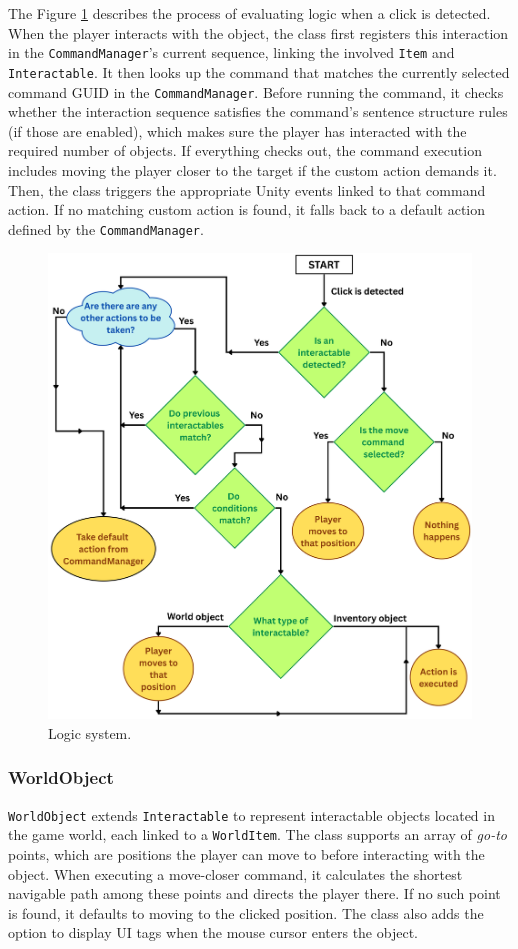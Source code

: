 The Figure \ref{fig:Interactable} describes the process of evaluating logic when a click is detected. When the player interacts with the object, the class first registers this interaction in the \verb|CommandManager|’s current sequence, linking the involved \verb|Item| and \verb|Interactable|. It then looks up the command that matches the currently selected command GUID in the \verb|CommandManager|. Before running the command, it checks whether the interaction sequence satisfies the command’s sentence structure rules (if those are enabled), which makes sure the player has interacted with the required number of objects. If everything checks out, the command execution includes moving the player closer to the target if the custom action demands it. Then, the class triggers the appropriate Unity events linked to that command action. If no matching custom action is found, it falls back to a default action defined by the \verb|CommandManager|.

\begin{figure}[H]
\centering
\includegraphics[width=0.9\linewidth]{img/Commands3.png}
\caption{Logic system.}
\label{fig:Interactable}
\end{figure}

\subsubsection{WorldObject}
\verb|WorldObject| extends \verb|Interactable| to represent interactable objects located in the game world, each linked to a \verb|WorldItem|. The class supports an array of \textit{go-to} points, which are positions the player can move to before interacting with the object. When executing a move-closer command, it calculates the shortest navigable path among these points and directs the player there. If no such point is found, it defaults to moving to the clicked position. The class also adds the option to display UI tags when the mouse cursor enters the object.

